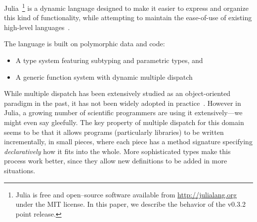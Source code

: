 \documentclass[pldi]{sigplanconf-pldi15}
\begin{document}
Julia~\footnote{Julia is free and open--source software available from
\url{http://julialang.org} under the MIT license. In this paper, we describe
the behavior of the v0.3.2 point release.} is a dynamic language designed to
make it easier to express and organize this kind of functionality, while
attempting to maintain the ease-of-use of existing high-level
languages~\cite{Bezanson2012,Bezanson2014b}.

The language is built on polymorphic data and code:

\begin{itemize}
	\item A type system featuring subtyping and parametric types, and
	\item A generic function system with dynamic multiple dispatch
\end{itemize}
%



While multiple dispatch has been extensively studied as an object-oriented
paradigm in the past, it has not been widely adopted in practice~\cite{Muschevici:2008}.
However in Julia, a growing number of scientific programmers are using it
extensively---we might even say gleefully. The key property of multiple
dispatch for this domain seems to be that it allows programs (particularly libraries)
to be written incrementally, in small pieces, where each piece has a method signature
specifying \emph{declaratively} how it fits into the whole.
More sophisticated types make this process work better, since they allow new
definitions to be added in more situations.
\end{document}

